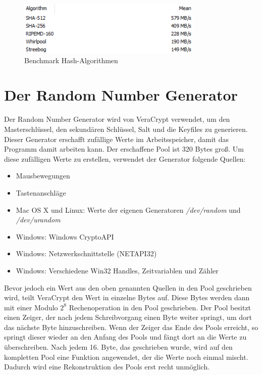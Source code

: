 \documentclass[12pt,a4paper]{scrreprt}
\begin{document}
\begin{figure}[h]
\begin{center}
\includegraphics[width=250pt]{media/hashBenchmark.png}
\caption{Benchmark Hash-Algorithmen}
\label{hashbench}
\end{center}
\end{figure}

\section{Der Random Number Generator}
Der Random Number Generator wird von VeraCrypt verwendet, um den Masterschlüssel, den sekundären Schlüssel, Salt und die Keyfiles zu generieren. Dieser Generator erschafft zufällige Werte im Arbeitsspeicher, damit das Programm damit arbeiten kann. Der erschaffene Pool ist 320 Bytes groß. Um diese zufälligen Werte zu erstellen, verwendet der Generator folgende Quellen:

\begin{itemize}
\item Mausbewegungen
\item Tastenanschläge
\item Mac OS X und Linux: Werte der eigenen Generatoren \textit{/dev/random} und \textit{/dev/urandom}
\item Windows: Windows CryptoAPI
\item Windows: Netzwerkschnittstelle (NETAPI32)
\item Windows: Verschiedene Win32 Handles, Zeitvariablen und Zähler
\end{itemize}

\noindent Bevor jedoch ein Wert aus den oben genannten Quellen in den Pool geschrieben wird, teilt VeraCrypt den Wert in einzelne Bytes auf. Diese Bytes werden dann mit einer Modulo $2^8$ Rechenoperation in den Pool geschrieben. Der Pool besitzt einen Zeiger, der nach jedem Schreibvorgang einen Byte weiter springt, um dort das nächste Byte hinzuschreiben. Wenn der Zeiger das Ende des Pools erreicht, so springt dieser wieder an den Anfang des Pools und fängt dort an die Werte zu überschreiben. Nach jedem 16. Byte, das geschrieben wurde, wird auf den kompletten Pool eine Funktion angewendet, der die Werte noch einmal mischt. Dadurch wird eine Rekonstruktion des Pools erst recht unmöglich.
\end{document}
